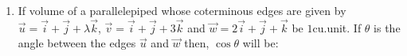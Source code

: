 \documentclass[journal,12pt,onecolumn]{IEEEtran}
\theoremstyle{remark}
\begin{document}
\begin{enumerate}
\item If volume of a parallelepiped whose coterminous edges are given by\newline
$\vec{u} = \vec{i}+\vec{j}+\lambda\vec{k}$,\newline
$\vec{v} = \vec{i}+\vec{j}+3\vec{k}$ and\newline
$\vec{w} = 2\vec{i}+\vec{j}+\vec{k}$\newline
be $1$cu.unit. If $\theta$ is the angle between the edges $\vec{u}$ and $\vec{w}$ then, $\cos\theta$ will be:
\begin{enumerate}
\end{enumerate}

\end{enumerate}
\end{document}
